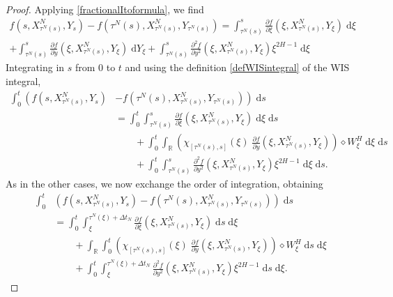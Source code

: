 \documentclass[reqno,12pt]{amsart}
\theoremstyle{plain}%
\theoremstyle{definition}
\begin{document}
\begin{proof}
    Applying \eqref{fractionalItoformula}, we find
    \begin{multline*}
        f(s, X_{\tau^N(s)}^N, Y_s) - f(\tau^N(s), X_{\tau^N(s)}^N, Y_{\tau^N(s)}) = \int_{\tau^N(s)}^{s} \frac{\partial f}{\partial \xi}(\xi, X_{\tau^N(s)}^N, Y_\xi) \;\mathrm{d}\xi \\
        + \int_{\tau^N(s)}^{s} \frac{\partial f}{\partial y}(\xi, X_{\tau^N(s)}^N, Y_\xi) \;\mathrm{d}Y_\xi + \int_{\tau^N(s)}^{s} \frac{\partial^2 f}{\partial y^2}(\xi, X_{\tau^N(s)}^N, Y_\xi) \xi^{2H - 1}\;\mathrm{d}\xi
    \end{multline*}
    Integrating in $s$ from $0$ to $t$ and using the definition \eqref{defWISintegral} of the WIS integral,
    \begin{align*}
        \int_0^t \left(f(s, X_{\tau^N(s)}^N, Y_s) \right. & \left. - f(\tau^N(s), X_{\tau^N(s)}^N, Y_{\tau^N(s)}) \right) \;\mathrm{d}s \\
        & = \int_0^t \int_{\tau^N(s)}^{s} \frac{\partial f}{\partial \xi}(\xi, X_{\tau^N(s)}^N, Y_\xi) \;\mathrm{d}\xi \;\mathrm{d}s \\
        & \qquad + \int_0^t \int_\mathbb{R} \left(\chi_{[\tau^N(s), s]}(\xi)\;\frac{\partial f}{\partial y}(\xi, X_{\tau^N(s)}^N, Y_\xi) \right) \diamond W_\xi^H \;\mathrm{d}\xi \;\mathrm{d}s \\
        & \qquad + \int_0^t \int_{\tau^N(s)}^{s} \frac{\partial^2 f}{\partial y^2}(\xi, X_{\tau^N(s)}^N, Y_\xi) \xi^{2H - 1}\;\mathrm{d}\xi \;\mathrm{d}s.
    \end{align*}
    As in the other cases, we now exchange the order of integration, obtaining
    \begin{equation}
        \begin{aligned}
            \int_0^t & \left(f(s, X_{\tau^N(s)}^N, Y_s) - f(\tau^N(s), X_{\tau^N(s)}^N, Y_{\tau^N(s)}) \right) \;\mathrm{d}s \\
            & = \int_0^t \int_{\xi}^{\tau^N(\xi)+\Delta t_N} \frac{\partial f}{\partial \xi}(\xi, X_{\tau^N(s)}^N, Y_\xi) \;\mathrm{d}s \;\mathrm{d}\xi \\
            & \qquad + \int_\mathbb{R} \int_0^t \left(\chi_{[\tau^N(s), s]}(\xi)\;\frac{\partial f}{\partial y}(\xi, X_{\tau^N(s)}^N, Y_\xi) \right) \diamond W_\xi^H \;\mathrm{d}s \;\mathrm{d}\xi \\
            & \qquad + \int_0^t \int_{\xi}^{\tau^N(\xi)+\Delta t_N} \frac{\partial^2 f}{\partial y^2}(\xi, X_{\tau^N(s)}^N, Y_\xi) \xi^{2H - 1}\;\mathrm{d}s\;\mathrm{d}\xi.

\end{aligned}
\end{equation}
\end{proof}
\end{document}
